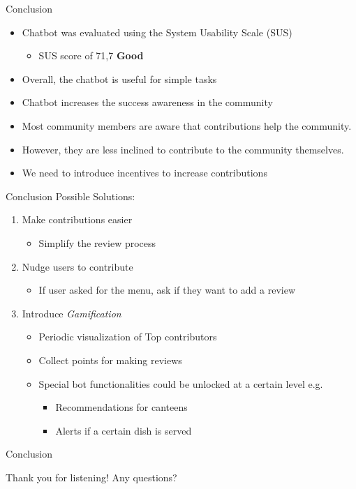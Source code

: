 \begin{frame}{Conclusion}
  \begin{itemize}
    \item Chatbot was evaluated using the System Usability Scale (SUS)
    \begin{itemize}
      \item SUS score of 71,7 \textbf{Good}
    \end{itemize}
    \item Overall, the chatbot is useful for simple tasks
    \item Chatbot increases the success awareness in the community
    \item Most community members are aware that contributions help the community.
    \item However, they are less inclined to contribute to the community themselves.
    \item We need to introduce incentives to increase contributions
  \end{itemize}
\end{frame}

\begin{frame}{Conclusion}
  Possible Solutions: 
  \begin{enumerate}
    \item Make contributions easier \cite{Niel06}
    \begin{itemize}
      \item Simplify the review process
    \end{itemize}
    \item Nudge users to contribute
   \begin{itemize}
     \item If user asked for the menu, ask if they want to add a review
   \end{itemize} 
   \item Introduce \emph{Gamification}
   \begin{itemize}
     \item Periodic visualization of Top contributors 
     \item Collect points for making reviews
     \item Special bot functionalities could be unlocked at a certain level e.g.
     \begin{itemize}
       \item Recommendations for canteens
       \item Alerts if a certain dish is served
     \end{itemize}
   \end{itemize}
\end{enumerate}
\end{frame}

\begin{frame}{Conclusion}
  \Huge{\centerline{Thank you for listening! Any questions?}}
\end{frame}


